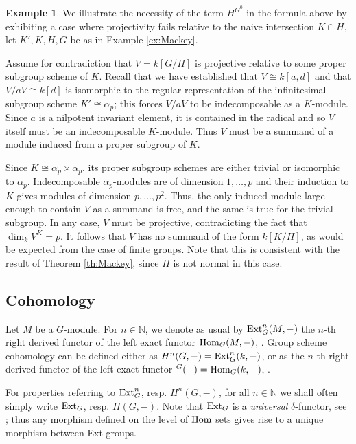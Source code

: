 \documentclass[12pt]{amsart}
\theoremstyle{definition}
\newtheorem{example}[theorem]{Example}
\begin{document}
\begin{example}
	We illustrate the necessity of the term $H^{G^0}$ in the formula above by exhibiting a case where projectivity fails relative to the naive intersection $K \cap H$, let $K',K,H,G$ be as in Example \ref{ex:Mackey}. 
	
	Assume for contradiction that $V=k[G/H]$ is projective relative to some proper subgroup scheme of $K$.  Recall that we have established that $V\cong k[a,d]$ and that $V/aV \cong k[d]$ is isomorphic to the regular representation of the infinitesimal subgroup scheme $K'\cong \alpha_p$; this forces $V/aV$ to be indecomposable as a $K$-module. Since $a$ is a nilpotent invariant element, it is contained in the radical and so $V$ itself must be an indecomposable $K$-module. Thus $V$ must be a summand of a module induced from a proper subgroup of $K$. 
	
	Since $K\cong \alpha_p\times\alpha_p$, its proper subgroup schemes are either trivial or isomorphic to $\alpha_p$. Indecomposable $\alpha_p$-modules are of dimension $1,\ldots,p$  and their induction to $K$ gives modules of dimension $p,\ldots,p^2$. Thus, the only induced module large enough to contain $V$ as a summand is free, and the same is true for the trivial subgroup. In any case, $V$ must be projective, contradicting the fact that $\dim_k V^K= p$. It follows that $V$ has no summand of the form $k[K/H]$, as would be expected from the case of finite groups. Note that this is consistent with the result of Theorem \ref{th:Mackey}, since $H$ is not normal in this case.
\end{example}


\subsection{Cohomology}\label{sec:coh}
Let $M$ be a $G$-module. For $n\in\mathbb{N}$, we denote as usual by ${\rm Ext }_G^n(M,-)$ the $n$-th right derived functor of the left exact functor ${\rm Hom}_G(M,-)$, \cite[2.5.2]{Weibel}. Group scheme cohomology can be defined either as $H^n(G,-)={\rm Ext }_G^n(k,-)$, or as the $n$-th right derived functor of the left exact functor ${}^G(-)={\rm Hom}_G(k,-)$, \cite[I.4.2]{MR2015057}.

For properties referring to ${\rm Ext }_G^n$, resp. $H^n(G,-)$, for all $n\in\mathbb{N}$ we shall often simply write ${\rm Ext }_G$, resp. $H(G,-)$. Note that ${\rm Ext}_G$ is a {\em universal} $\delta$-functor, see \cite[2.6]{Weibel}; thus any morphism defined on the level of ${\rm Hom}$ sets gives rise to a unique morphism between {\rm Ext} groups.
\end{document}
